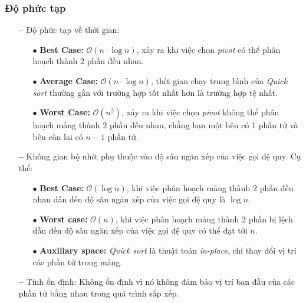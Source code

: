 \subsubsection{Độ phức tạp} 
\begin{itemize}
    \item[\textbf{--}]Độ phức tạp về thời gian:
        \begin{itemize}
            \item[$\bullet$] \textbf{Best Case:} $\mathcal{O}(n \cdot \log{}n)$, xảy ra khi việc chọn \textit{pivot} có thể phân hoạch thành 2 phần đều nhau.
            \item[$\bullet$] \textbf{Average Case:}  $\mathcal{O}(n \cdot \log{}n)$, thời gian chạy trung bình của \textit{Quick sort} thường gần với trường hợp tốt nhất hơn là trường hợp tệ nhất. \cite{CLRS2009} 
            \item[$\bullet$] \textbf{Worst Case:}  $\mathcal{O}(n^{2})$, xảy ra khi việc chọn \textit{pivot} không thể phân hoạch mảng thành 2 phần đều nhau, chẳng hạn một bên có 1 phần tử và bên còn lại có $n - 1$ phần tử.
        \end{itemize}
    \item[\textbf{--}]Không gian bộ nhớ: phụ thuộc vào độ sâu ngăn xếp của việc gọi đệ quy. Cụ thể:
        \begin{itemize}
            \item[$\bullet$] \textbf{Best Case:} $\mathcal{O}(\log{}n)$, khi việc phân hoạch mảng thành 2 phần đều nhau dẫn đến độ sâu ngăn xếp của việc gọi đệ quy là $\log{}n$.
            \item[$\bullet$] \textbf{Worst case:} $\mathcal{O}(n)$, khi việc phân hoạch mảng thành 2 phần bị lệch dẫn đến độ sâu ngăn xếp của việc gọi đệ quy có thể đạt tới $n$. 
            \item[$\bullet$] \textbf{Auxiliary space:} \textit{Quick sort} là thuật toán \textit{in-place}, chỉ thay đổi vị trí các phần tử trong mảng.
        \end{itemize}
    \item[\textbf{--}]Tính ổn định: Không ổn định vì nó không đảm bảo vị trí ban đầu của các phần tử bằng nhau trong quá trình sắp xếp.
\end{itemize}